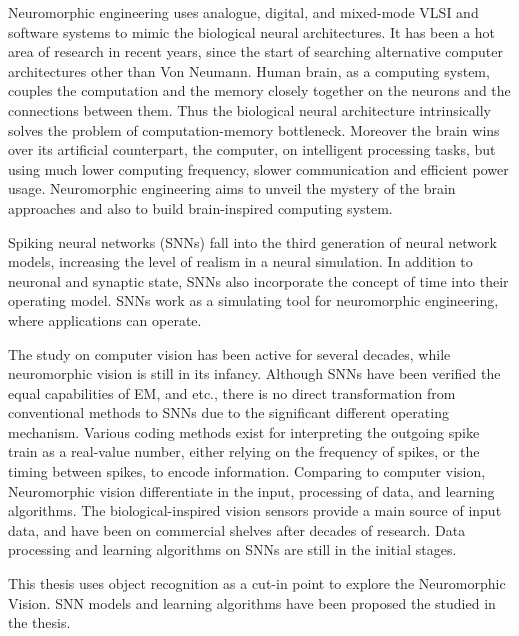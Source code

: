Neuromorphic engineering uses analogue, digital, and mixed-mode VLSI and software systems to mimic the biological neural architectures. 
It has been a hot area of research in recent years, since the start of searching alternative computer architectures other than Von Neumann.
Human brain, as a computing system, couples the computation and the memory closely together on the neurons and the connections between them.
Thus the biological neural architecture intrinsically solves the problem of computation-memory bottleneck.
Moreover the brain wins over its artificial counterpart, the computer, on intelligent processing tasks, but using much lower computing frequency, slower communication and efficient power usage.
Neuromorphic engineering aims to unveil the mystery of the brain approaches and also to build brain-inspired computing system.
 
Spiking neural networks (SNNs) fall into the third generation of neural network models, increasing the level of realism in a neural simulation.
In addition to neuronal and synaptic state, SNNs also incorporate the concept of time into their operating model.
SNNs work as a simulating tool for neuromorphic engineering, where applications can operate.

The study on computer vision has been active for several decades, while neuromorphic vision is still in its infancy.
Although SNNs have been verified the equal capabilities of EM, and etc., there is no direct transformation from conventional methods to SNNs due to the significant different operating mechanism.
Various coding methods exist for interpreting the outgoing spike train as a real-value number, either relying on the frequency of spikes, or the timing between spikes, to encode information. %
Comparing to computer vision, Neuromorphic vision differentiate in the input, processing of data, and learning algorithms.
The biological-inspired vision sensors provide a main source of input data, and have been on commercial shelves after decades of research.
Data processing and learning algorithms on SNNs are still in the initial stages.

This thesis uses object recognition as a cut-in point to explore the Neuromorphic Vision.
SNN models and learning algorithms have been proposed the studied in the thesis.

